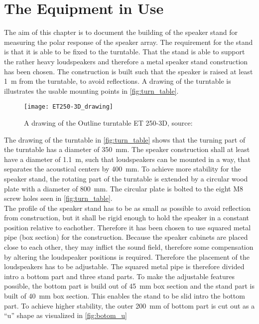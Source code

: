 \section{The Equipment in Use}\label{sec:hardware}
The aim of this chapter is to document the building of the speaker stand for measuring the polar response of the speaker array. The requirement for the stand is that it is able to be fixed to the turntable. That the stand is able to support the rather heavy loudspeakers and therefore a metal speaker stand construction has been chosen.  The construction is built such that the speaker is raised at least \SI{1}{\meter} from the turntable, to avoid reflections. A drawing of the turntable is illustrates the usable mounting points in \autoref{fig:turn_table}.


 \begin{figure}[H]
	\centering
	\texttt{[image: ET250-3D\_drawing]}
	\caption{A drawing of the Outline turntable ET 250-3D, source: \citep{ET250-3D}}
		\label{fig:turn_table}
\end{figure}



The drawing of the turntable in \autoref{fig:turn_table} shows that the turning part of the turntable has a diameter of \SI{350}{\milli\meter}. The speaker construction shall at least have a diameter of \SI{1.1}{\meter}, such that loudspeakers can be mounted in a way, that separates the acoustical centers by \SI{400}{\milli\meter}. To achieve more stability for the speaker stand, the rotating part of the turntable is extended by a circular wood plate with a diameter of \SI{800}{\milli\meter}. The circular plate is bolted to the eight M8 screw holes seen in \autoref{fig:turn_table}. \\
The profile of the speaker stand has to be as small as possible to avoid reflection from construction, but it shall be rigid enough to hold the speaker in a constant position relative to eachother. Therefore it has been chosen to use squared metal pipe (box section) for the construction.  Because the speaker cabinets are placed close to each other, they may inflict the sound field, therefore some compensation by altering the loudspeaker positions is required. Therefore the placement of the loudspeakers has to be adjustable. The squared metal pipe is therefore divided intro a bottom part and three stand parts. To make the adjustable features possible, the bottom part is build out of \SI{45}{\milli\meter} box section and the stand part is built of \SI{40}{\milli\meter} box section. This enables the stand to be slid intro the bottom part. To achieve higher stability, the outer \SI{200}{\milli\meter} of bottom part is cut out as a ``u'' shape as visualized in \autoref{fig:botom_u}

